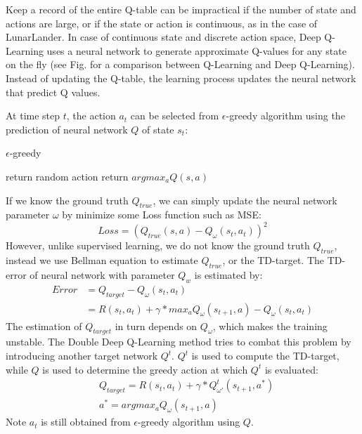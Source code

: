 \documentclass[conference]{IEEEtran}
\begin{document}
Keep a record of the entire Q-table can be impractical if the number of state and actions are large, or if the state or action is continuous, as in the case of LunarLander. In case of continuous state and discrete action space, Deep Q-Learning uses a neural network to generate approximate Q-values for any state on the fly (see Fig. for a comparison between Q-Learning and Deep Q-Learning). Instead of updating the Q-table, the learning process updates the neural network that predict Q values.



At time step $t$, the action $a_t$ can be selected from $\epsilon$-greedy algorithm using the prediction of neural network $Q$ of state $s_t$:

\begin{algorithm}[h!]
	\caption{$\epsilon$-greedy}
\begin{algorithmic}
		\State return random action
	\Else
		\State return $argmax_a Q(s, a)$
	\EndIf
	\EndFunction
\end{algorithmic}
\label{algo:seq}
\end{algorithm}

If we know the ground truth $Q_{true}$, we can simply update the neural network parameter $\omega$ by minimize some Loss function such as MSE:
\begin{equation}
Loss = (Q_{true}(s, a) - Q_\omega(s_t, a_t))^2
\end{equation}
However, unlike supervised learning, we do not know the ground truth $Q_{true}$, instead we use Bellman equation to estimate $Q_{true}$, or the TD-target. The TD-error of neural network with parameter $Q_w$ is estimated by:
\begin{align}
Error &= Q_{target} - Q_\omega(s_t, a_t)  \\
&= R(s_t, a_t) + \gamma * max_a Q_{\omega}(s_{t+1}, a) - Q_\omega(s_t, a_t)
\end{align}
The estimation of $Q_{target}$ in turn depends on $Q_\omega$, which makes the training unstable. The Double Deep Q-Learning method tries to combat this problem by introducing another target network $Q^t$. $Q^t$ is used to compute the TD-target, while $Q$ is used to determine the greedy action at which $Q^t$ is evaluated:
\begin{align}
& Q_{target} = R(s_t, a_t) + \gamma * Q^t_{\omega'}(s_{t+1}, a^*) \\
& a^* = argmax_a Q_\omega(s_{t+1}, a) 
\end{align}
Note $a_t$ is still obtained from $\epsilon$-greedy algorithm using $Q$.
\end{document}
